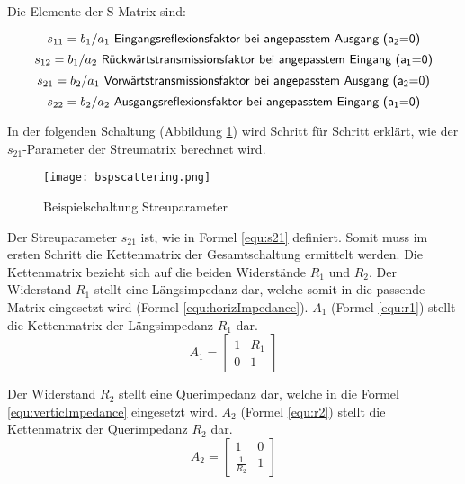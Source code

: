 Die Elemente der S-Matrix sind:

\begin{equation}\label{equ:def_s11}
	s_{11} = b_1/a_1\textsf{ Eingangsreflexionsfaktor bei angepasstem Ausgang (a\textsubscript{2}=0)}
\end{equation}
\begin{equation}\label{equ:def_s12}
	s_{12} = b_1/a_2\textsf{ Rückwärtstransmissionsfaktor bei angepasstem Eingang (a\textsubscript{1}=0)}
\end{equation}
\begin{equation}\label{equ:def_s21}
	s_{21} = b_2/a_1\textsf{ Vorwärtstransmissionsfaktor bei angepasstem Ausgang (a\textsubscript{2}=0)}
\end{equation}
\begin{equation}\label{equ:def_s22}
	s_{22} = b_2/a_2\textsf{ Ausgangsreflexionsfaktor bei angepasstem Eingang (a\textsubscript{1}=0)}
\end{equation}

In der folgenden Schaltung (Abbildung \ref{fig:bspscattering}) wird Schritt für Schritt erklärt, wie der \\ $s_{21}$-Parameter der Streumatrix berechnet wird.
 
\begin{figure}[H]
	\centering
	\texttt{[image: bspscattering.png]}
	\caption{Beispielschaltung Streuparameter}
	\label{fig:bspscattering}
\end{figure}

Der Streuparameter $s_{21}$ ist, wie in Formel \ref{equ:s21} definiert. Somit muss im ersten Schritt die Kettenmatrix der Gesamtschaltung ermittelt werden. Die Kettenmatrix bezieht sich auf die beiden Widerstände $R_1$ und $R_2$. Der Widerstand $R_1$ stellt eine Längsimpedanz dar, welche somit in die passende Matrix eingesetzt wird (Formel \ref{equ:horizImpedance}). $A_1$ (Formel \ref{equ:r1}) stellt die Kettenmatrix der Längsimpedanz $R_1$ dar.
\begin{equation}\label{equ:r1}
	A_1 = \left[\begin{matrix}
			1&R_1\\0&1
			\end{matrix}\right]
\end{equation}

Der Widerstand $R_2$ stellt eine Querimpedanz dar, welche in die Formel \ref{equ:verticImpedance} eingesetzt wird. $A_2$ (Formel \ref{equ:r2}) stellt die Kettenmatrix der Querimpedanz $R_2$ dar.
\begin{equation}\label{equ:r2}
			A_2 = \left[\begin{matrix}
			1&0\\\frac{1}{R_2}&1
			\end{matrix}\right]
\end{equation}


